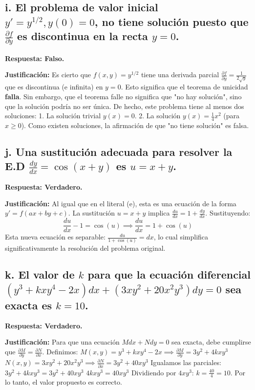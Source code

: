 \documentclass[a4paper]{article}
\begin{document}
\subsection*{i. El problema de valor inicial $y' = y^{1/2}, y(0) = 0$, no tiene solución puesto que $\frac{\partial f}{\partial y}$ es discontinua en la recta $y = 0$.}

\textbf{Respuesta: Falso.}

\textbf{Justificación:}
Es cierto que $f(x, y) = y^{1/2}$ tiene una derivada parcial $\frac{\partial f}{\partial y} = \frac{1}{2\sqrt{y}}$ que es discontinua (e infinita) en $y = 0$. Esto significa que el teorema de unicidad \textbf{falla}. Sin embargo, que el teorema falle no significa que "no hay solución", sino que la solución podría no ser única.
De hecho, este problema tiene al menos dos soluciones:
1. La solución trivial $y(x) = 0$.
2. La solución $y(x) = \frac{1}{4}x^2$ (para $x \geq 0$).
Como existen soluciones, la afirmación de que "no tiene solución" es falsa.

\subsection*{j. Una sustitución adecuada para resolver la E.D $\frac{dy}{dx} = \cos(x + y)$ es $u = x + y$.}

\textbf{Respuesta: Verdadero.}

\textbf{Justificación:}
Al igual que en el literal (e), esta es una ecuación de la forma $y' = f(ax + by + c)$. La sustitución $u = x + y$ implica $\frac{du}{dx} = 1 + \frac{dy}{dx}$. Sustituyendo:
$$\frac{du}{dx} - 1 = \cos(u) \implies \frac{du}{dx} = 1 + \cos(u)$$
Esta nueva ecuación es separable: $\frac{du}{1+\cos(u)} = dx$, lo cual simplifica significativamente la resolución del problema original.

\subsection*{k. El valor de $k$ para que la ecuación diferencial $(y^3 + kxy^4 - 2x)dx + (3xy^2 + 20x^2y^3)dy = 0$ sea exacta es $k = 10$.}

\textbf{Respuesta: Verdadero.}

\textbf{Justificación:}
Para que una ecuación $Mdx + Ndy = 0$ sea exacta, debe cumplirse que $\frac{\partial M}{\partial y} = \frac{\partial N}{\partial x}$.
Definimos:
$M(x, y) = y^3 + kxy^4 - 2x \implies \frac{\partial M}{\partial y} = 3y^2 + 4kxy^3$
$N(x, y) = 3xy^2 + 20x^2y^3 \implies \frac{\partial N}{\partial x} = 3y^2 + 40xy^3$
Igualamos las parciales:
$3y^2 + 4kxy^3 = 3y^2 + 40xy^3$
$4kxy^3 = 40xy^3$
Dividiendo por $4xy^3$:
$k = \frac{40}{4} = 10$.
Por lo tanto, el valor propuesto es correcto.
\end{document}
